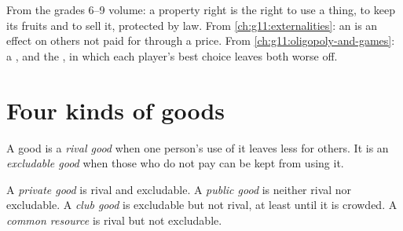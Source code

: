 \begin{recall}
From the grades 6--9 volume: a property right is the right to use a thing, to keep its fruits and to sell it, protected by law. From
\cref{ch:g11:externalities}: an  is an effect on others not paid for through a price. From \cref{ch:g11:oligopoly-and-games}: a , and the
, in which each player's best choice leaves both worse off.
\end{recall}

\section{Four kinds of goods}\label{sec:g11:public-goods-and-commons:kinds}

\begin{definition}\label{def:g11:public-goods-and-commons:rival}
A good is a \emph{rival good} when one person's use of it leaves less for others. It is an \emph{excludable good}%
\label{def:g11:public-goods-and-commons:excludable} when those who do not pay can be kept from using it.
\end{definition}

\begin{definition}\label{def:g11:public-goods-and-commons:private-good}
A \emph{private good} is rival and excludable. A \emph{public good}%
\label{def:g11:public-goods-and-commons:public-good} is neither rival nor excludable. A \emph{club good}%
\label{def:g11:public-goods-and-commons:club-good} is excludable but not rival, at least until it is crowded. A \emph{common resource}\label{def:g11:public-goods-and-commons:common-resource} is rival but not excludable.
\end{definition}

